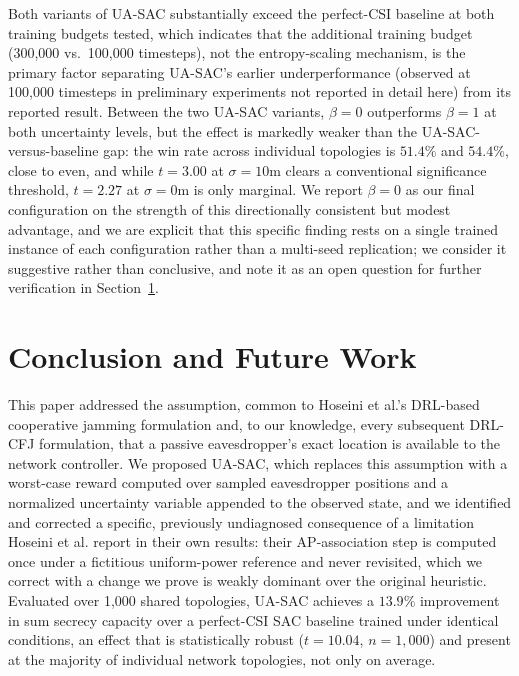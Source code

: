 \documentclass[conference]{IEEEtran}
\begin{document}
Both variants of UA-SAC substantially exceed the perfect-CSI baseline at both training budgets tested, which indicates that the additional training budget (300{,}000 vs.\ 100{,}000 timesteps), not the entropy-scaling mechanism, is the primary factor separating UA-SAC's earlier underperformance (observed at 100{,}000 timesteps in preliminary experiments not reported in detail here) from its reported result. Between the two UA-SAC variants, $\beta=0$ outperforms $\beta=1$ at both uncertainty levels, but the effect is markedly weaker than the UA-SAC-versus-baseline gap: the win rate across individual topologies is $51.4\%$ and $54.4\%$, close to even, and while $t=3.00$ at $\sigma=10$m clears a conventional significance threshold, $t=2.27$ at $\sigma=0$m is only marginal. We report $\beta=0$ as our final configuration on the strength of this directionally consistent but modest advantage, and we are explicit that this specific finding rests on a single trained instance of each configuration rather than a multi-seed replication; we consider it suggestive rather than conclusive, and note it as an open question for further verification in Section~\ref{sec:conclusion}.

\section{Conclusion and Future Work}
\label{sec:conclusion}

This paper addressed the assumption, common to Hoseini et al.'s DRL-based cooperative jamming formulation and, to our knowledge, every subsequent DRL-CFJ formulation, that a passive eavesdropper's exact location is available to the network controller. We proposed UA-SAC, which replaces this assumption with a worst-case reward computed over sampled eavesdropper positions and a normalized uncertainty variable appended to the observed state, and we identified and corrected a specific, previously undiagnosed consequence of a limitation Hoseini et al. report in their own results: their AP-association step is computed once under a fictitious uniform-power reference and never revisited, which we correct with a change we prove is weakly dominant over the original heuristic. Evaluated over 1{,}000 shared topologies, UA-SAC achieves a $13.9\%$ improvement in sum secrecy capacity over a perfect-CSI SAC baseline trained under identical conditions, an effect that is statistically robust ($t=10.04$, $n=1{,}000$) and present at the majority of individual network topologies, not only on average.
\end{document}
